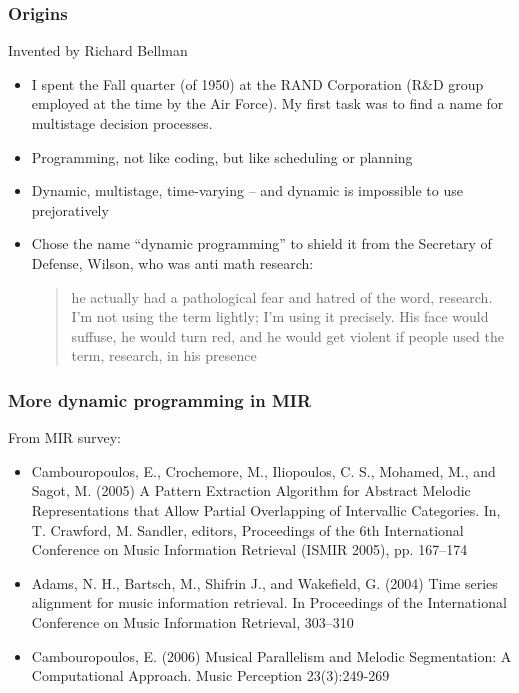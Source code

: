 \documentclass{beamer}
\begin{document}
\begin{frame}
	\frametitle{Origins}
	Invented by Richard Bellman
	\begin{itemize}
		\item
			I spent the Fall quarter (of 1950) at the RAND Corporation (R\&D group employed at the time by the Air Force). My first task was to find a name for multistage decision processes.
		\item
			Programming, not like coding, but like scheduling or planning
		\item
			Dynamic, multistage, time-varying -- and dynamic is impossible to use prejoratively
		\item
			Chose the name ``dynamic programming'' to shield it from the Secretary of Defense, Wilson, who was anti math research:
			\begin{quote}
			he actually had a pathological fear and hatred of the word, research. I’m not using the term lightly; I'm using it precisely. His face would suffuse, he would turn red, and he would get violent if people used the term, research, in his presence
			\end{quote}
	\end{itemize}
\end{frame}

\begin{frame}
	\frametitle{More dynamic programming in MIR}
	From MIR survey:
	\begin{itemize}
		\item
			Cambouropoulos, E., Crochemore, M., Iliopoulos, C. S., Mohamed, M., and Sagot, M. (2005) A Pattern Extraction Algorithm for Abstract Melodic Representations that Allow Partial Overlapping of Intervallic Categories. In, T. Crawford, M. Sandler, editors, Proceedings of the 6th International Conference on Music Information Retrieval (ISMIR 2005), pp. 167–174
		\item
			Adams, N. H., Bartsch, M., Shifrin J., and Wakefield, G. (2004) Time series alignment for music information retrieval. In Proceedings of the International Conference on Music Information Retrieval, 303–310 
		\item
			Cambouropoulos, E. (2006) Musical Parallelism and Melodic Segmentation: A Computational Approach. Music Perception 23(3):249-269 
	\end{itemize}
\end{frame}
\end{document}
